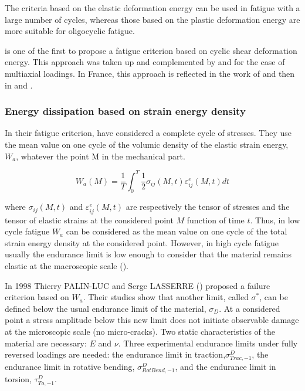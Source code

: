 The criteria based on the elastic deformation energy can be used in fatigue with a large number of cycles, whereas those based on the plastic deformation energy are more suitable for oligocyclic fatigue.

\cite{ellyin1974criterion} is one of the first to propose a fatigue criterion based on cyclic shear deformation energy. This approach was taken up and complemented by \cite{lefebvre1981cognitive} and \cite{ellyin1991phase} for the case of multiaxial loadings. In France, this approach is reflected in the work of \cite{Froustey1992} and then in \cite{palin1996fatigue} and \cite{banvillet2001prevision}.

\subsubsection{Energy dissipation based on strain energy density}

In their fatigue criterion, \cite{Froustey1992}  have considered a complete cycle of
stresses. They use the mean value on one cycle of
the volumic density of the elastic strain energy, $W_a$, whatever the point
M in the mechanical part.

$$W_a(M)=\frac{1}{T}\int_{0}^{T}\frac{1}{2}\sigma_{ij}(M,t)\varepsilon_{ij}^e(M,t)dt$$

where $\sigma_{ij}(M,t)$ and $\varepsilon_{ij}^e(M,t)$ are respectively the tensor of stresses and the tensor of
elastic strains at the considered point $M$ function of time $t$.  Thus, in low cycle fatigue $W_a$ can be considered as the mean value on one
cycle of the total strain energy density at the considered point. However, in high cycle fatigue usually the endurance limit
is low enough to consider that the material remains elastic at the macroscopic scale (\cite{chaboche1988non}).

In 1998 Thierry PALIN-LUC and Serge LASSERRE (\cite{palin1998energy}) proposed a failure criterion based on $W_a$. Their studies show that another limit, called $\sigma^*$, can be defined below
the usual endurance limit of the material, $\sigma_D$. At a considered point a stress amplitude
below this new limit does not initiate observable damage at the microscopic scale (no
micro-cracks). Two static characteristics of the material are necessary: $E$ and $\nu$. Three
experimental endurance limits under fully reversed loadings are needed: the endurance
limit in traction,$\sigma_{Trac,-1}^D$, the endurance limit in rotative bending, $\sigma_{RotBend,-1}^D$, and the
endurance limit in torsion, $\tau_{To,-1}^D$. 

